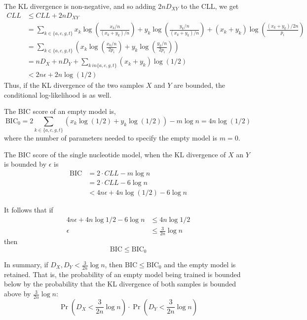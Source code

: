 \documentclass[letterpaper]{article}
\begin{document}
The KL divergence is non-negative, and so adding $2n D_{XY}$ to the CLL, we get
\begin{align*}
CLL &\le CLL + 2n D_{XY} \\
&=
\textstyle{
\sum_{k \in \{a, c, g, t\}} 
x_k \log \left( \frac{x_k/n}{(x_k + y_k)/n} \right)
+ y_k \log \left( \frac{y_k/n}{(x_k + y_k)/n} \right)
+ (x_k + y_k) \log \left( \frac{(x_k + y_k)/2n}{p_i} \right)} \\
&=
\textstyle{
\sum_{k \in \{a, c, g, t\}}
\left(
x_k \log \left( \frac{x_k/n}{2 p_i} \right) +
y_k \log \left( \frac{y_k/n}{2 p_i} \right)
\right)} \\
&=
\textstyle{
n D_{X} + n D_{Y} + \sum_{k \ in \{a, c, g, t\}} (x_k + y_k) \log (1/2)
} \\
&< 2n\epsilon + 2n \log (1/2)
\end{align*}
Thus, if the KL divergence of the two samples $X$ and $Y$ are bounded, the
conditional log-likelihood is as well.

The BIC score of an empty model is,
$$\text{BIC}_0 = 2 \sum_{k \in \{a, c, g, t\}}
\left(
x_k \log(1/2) + y_k \log(1/2) \right) - m
\log n = 4 n \log (1/2) $$
where the number of parameters needed to specify the empty model is $m = 0$.

The BIC score of the single nucleotide model, when the KL divergence of $X$ an
$Y$ is bounded by $\epsilon$ is
\begin{align*}
\text{BIC} &= 2 \cdot CLL - m \log n \\
&= 2 \cdot CLL - 6 \log n \\
&< 4n \epsilon + 4 n \log (1/2) - 6 \log n
\end{align*}

It follows that if
\begin{align*}
4n \epsilon + 4 n \log 1 / 2 - 6 \log n  &\le   4 n \log 1/2 \\
\epsilon &\le \frac{3}{2n} \log n
\end{align*}
then
$$ \text{BIC} \le \text{BIC}_0 $$

In summary, if $D_X, D_Y < \frac{3}{2n} \log n$, then $\text{BIC} \le
\text{BIC}_0$ and the empty model is retained. That is, the probability of an
empty model being trained is bounded below by the probability that the KL
divergence of both samples is bounded above by $\frac{3}{2n} \log n$:
$$ \Pr(D_{X} < \frac{3}{2n} \log n) \cdot 
\Pr(D_{Y} < \frac{3}{2n} \log n) $$
\end{document}
